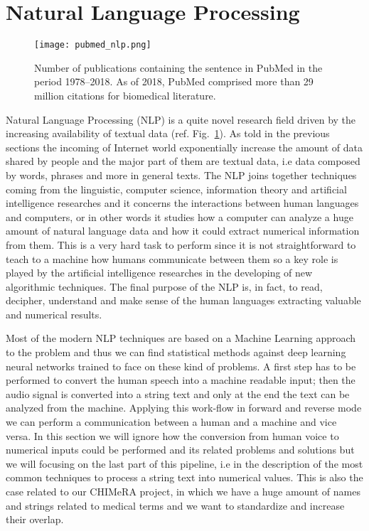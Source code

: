 \documentclass{standalone}
\begin{document}
\section[NLP]{Natural Language Processing}\label{chimera:nlp}


\begin{center}
\begin{figure}[htbp]
\centering
\texttt{[image: pubmed\_nlp.png]}
\caption{Number of publications containing the sentence  in PubMed in the period 1978–2018.
As of 2018, PubMed comprised more than 29 million citations for biomedical literature.
}
\label{fig:pubmed_nlp}
\end{figure}
\end{center}


Natural Language Processing (NLP) is a quite novel research field driven by the increasing availability of textual data (ref. Fig.~\ref{fig:pubmed_nlp}).
As told in the previous sections the incoming of Internet world exponentially increase the amount of data shared by people and the major part of them are textual data, i.e data composed by words, phrases and more in general texts.
The NLP joins together techniques coming from the linguistic, computer science, information theory and artificial intelligence researches and it concerns the interactions between human languages and computers, or in other words it studies how a computer can analyze a huge amount of natural language data and how it could extract numerical information from them.
This is a very hard task to perform since it is not straightforward to teach to a machine how humans communicate between them so a key role is played by the artificial intelligence researches in the developing of new algorithmic techniques.
The final purpose of the NLP is, in fact, to read, decipher, understand and make sense of the human languages extracting valuable and numerical results.

Most of the modern NLP techniques are based on a Machine Learning approach to the problem and thus we can find statistical methods against deep learning neural networks trained to face on these kind of problems.
A first step has to be performed to convert the human speech into a machine readable input; then the audio signal is converted into a string text and only at the end the text can be analyzed from the machine.
Applying this work-flow in forward and reverse mode we can perform a communication between a human and a machine and vice versa.
In this section we will ignore how the conversion from human voice to numerical inputs could be performed and its related problems and solutions but we will focusing on the last part of this pipeline, i.e in the description of the most common techniques to process a string text into numerical values.
This is also the case related to our \textsf{CHIMeRA} project, in which we have a huge amount of names and strings related to medical terms and we want to standardize and increase their overlap.
\end{document}
